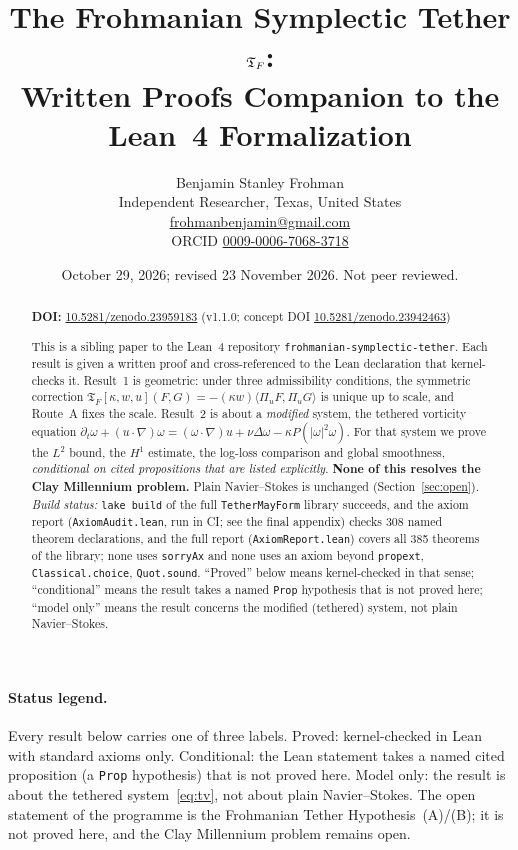 \documentclass[11pt]{article}
\title{The Frohmanian Symplectic Tether $\T$:\\ Written Proofs Companion to the Lean~4 Formalization}
\author{Benjamin Stanley Frohman\\ Independent Researcher, Texas, United States\\ \small\href{mailto:frohmanbenjamin@gmail.com}{frohmanbenjamin@gmail.com}\\ \small ORCID \href{https://orcid.org/0009-0006-7068-3718}{0009-0006-7068-3718}}
\date{October 29, 2026; revised 23 November 2026. Not peer reviewed.}
\theoremstyle{definition}
\theoremstyle{remark}
\newcommand{\T}{\mathfrak{T}_F}
\newcommand{\ip}[2]{\langle #1,#2\rangle}
\newcommand{\st}[1]{{\upshape\textsf{#1}}}
\begin{document}
\maketitle
\begin{abstract}
\noindent\textbf{DOI:} \href{https://doi.org/10.5281/zenodo.23959183}{10.5281/zenodo.23959183} (v1.1.0; concept DOI \href{https://doi.org/10.5281/zenodo.23942463}{10.5281/zenodo.23942463})\par\smallskip

This is a sibling paper to the Lean~4 repository \texttt{frohmanian-symplectic-tether}.
Each result is given a written proof and cross-referenced to the Lean declaration that
kernel-checks it. Result~1 is geometric: under three admissibility conditions, the symmetric
correction $\T[\kappa,w,u](F,G)=-(\kappa w)\ip{\Pi_uF}{\Pi_uG}$ is unique up to scale, and
Route~A fixes the scale. Result~2 is about a \emph{modified} system, the tethered vorticity equation
$\partial_t\omega+(u\cdot\nabla)\omega=(\omega\cdot\nabla)u+\nu\Delta\omega-\kappa P(|\omega|^2\omega)$.
For that system we prove the $L^2$ bound, the $H^1$ estimate, the log-loss comparison and global
smoothness, \emph{conditional on cited propositions that are listed explicitly}.
\textbf{None of this resolves the Clay Millennium problem.} Plain Navier--Stokes is unchanged
(Section~\ref{sec:open}).
\emph{Build status:} \texttt{lake build} of the full \texttt{TetherMayForm} library succeeds, and the axiom report
(\texttt{AxiomAudit.lean}, run in CI; see the final appendix) checks 308 named theorem declarations, and the
full report (\texttt{AxiomReport.lean}) covers all 385 theorems of the library; none uses \texttt{sorryAx}
and none uses an axiom beyond \texttt{propext}, \texttt{Classical.choice}, \texttt{Quot.sound}. ``Proved'' below
means kernel-checked in that sense; ``conditional'' means the result takes a named \texttt{Prop} hypothesis
that is not proved here; ``model only'' means the result concerns the modified (tethered) system,
not plain Navier--Stokes.
\end{abstract}

\paragraph{Status legend.} Every result below carries one of three labels.
\st{Proved}: kernel-checked in Lean with standard axioms only.
\st{Conditional}: the Lean statement takes a named cited proposition (a \texttt{Prop} hypothesis) that is not proved here.
\st{Model only}: the result is about the tethered system~\eqref{eq:tv}, not about plain Navier--Stokes.
The open statement of the programme is the Frohmanian Tether Hypothesis~(A)/(B); it is not proved here,
and the Clay Millennium problem remains open.
\end{document}
